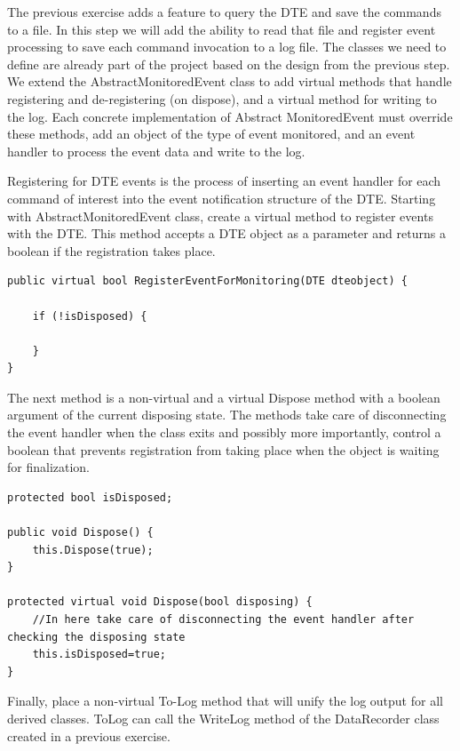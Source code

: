 \begin{Exercise}
The previous exercise adds a feature to query the DTE and save the commands to a file.  In this step we will add the ability to read that file and register event processing to save each command invocation to a log file.   The classes we need to define are already part of the project based on the design from the previous step.  We extend the AbstractMonitoredEvent class to add virtual methods that handle registering and de-registering (on dispose), and a virtual method for writing to the log.  Each concrete implementation of Abstract MonitoredEvent must override these methods, add an object of the type of event monitored, and an event handler to process the event data and write to the log.  

Registering for DTE events is the process of inserting an event handler for each command of interest into the event notification structure of the DTE.  Starting with AbstractMonitoredEvent class, create a virtual method to register events with the DTE.  This method accepts a DTE object as a parameter and returns a boolean if the registration takes place.

\begin{lstlisting}
public virtual bool RegisterEventForMonitoring(DTE dteobject) {

	if (!isDisposed) {
	
	}
}
\end{lstlisting}

The next method is a non-virtual and a virtual Dispose method with a boolean argument of the current disposing state.  The methods take care of disconnecting the event handler when the class exits and possibly more importantly, control a boolean that prevents registration from taking place when the object is waiting for finalization.

\begin{lstlisting}
protected bool isDisposed;

public void Dispose() {
	this.Dispose(true);
}

protected virtual void Dispose(bool disposing) {
	//In here take care of disconnecting the event handler after checking the disposing state
	this.isDisposed=true;
}
\end{lstlisting}

Finally, place a non-virtual To-Log method that will unify the log output for all derived classes.  ToLog can call the WriteLog method of the DataRecorder class created in a previous exercise.


\end{Exercise}
